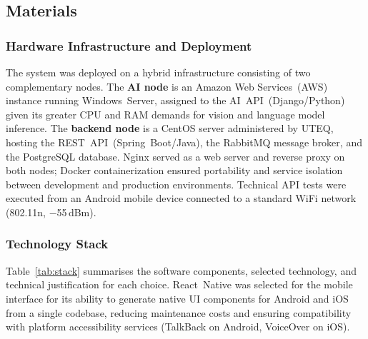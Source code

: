 \documentclass[journal]{IEEEtran}
\begin{document}
	\subsection{Materials}
	
	\subsubsection{Hardware Infrastructure and Deployment}
	The system was deployed on a hybrid infrastructure consisting of two
	complementary nodes.
	The \textbf{AI node} is an Amazon Web Services~(AWS) instance
	running Windows~Server, assigned to the AI~API~(Django/Python)
	given its greater CPU and RAM demands for vision and language model
	inference.
	The \textbf{backend node} is a CentOS server administered by
	UTEQ, hosting the REST~API~(Spring~Boot/Java), the RabbitMQ
	message broker, and the PostgreSQL database.
	Nginx served as a web server and reverse proxy on both nodes;
	Docker containerization ensured portability and service isolation
	between development and production environments.
	Technical API tests were executed from an Android mobile device
	connected to a standard WiFi network (802.11n, $-$55\,dBm).
	
	\subsubsection{Technology Stack}
	Table~\ref{tab:stack} summarises the software components,
	selected technology, and technical justification for each choice.
	React~Native was selected for the mobile interface for its ability
	to generate native UI components for Android and iOS from a single
	codebase, reducing maintenance costs and ensuring compatibility
	with platform accessibility services (TalkBack on Android,
	VoiceOver on iOS).
	
\end{document}
